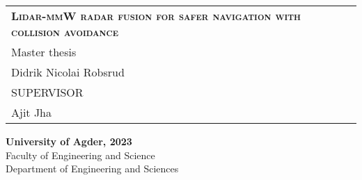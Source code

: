 \begin{titlepage}






\newcommand{\projectTitle}{Lidar-mmW radar fusion for safer navigation with collision avoidance}
\newcommand{\projectSubTitlel}{Master thesis}
\newcommand{\authors}{Didrik Nicolai Robsrud}
\newcommand{\supervisor}{Ajit Jha}

\newcommand{\projectYear}{2023}
\newcommand{\facultyName}{Faculty of Engineering and Science}
\newcommand{\departmentName}{Department of Engineering and Sciences}




\begin{tabular}{p{12cm}}
                                            \\[5cm]
    \LARGE{\textsc{\textbf{\projectTitle}}} \\[1.5cm]
    \projectSubTitlel                       \\[2.5cm]
    \large{\authors}                        \\[9cm]
    \Large{SUPERVISOR}                      \\
    \supervisor
\end{tabular}



\vfill


\textbf{University of Agder, \projectYear} \\
\small{\facultyName \\
\departmentName}
\vspace{1cm}
\end{titlepage}

